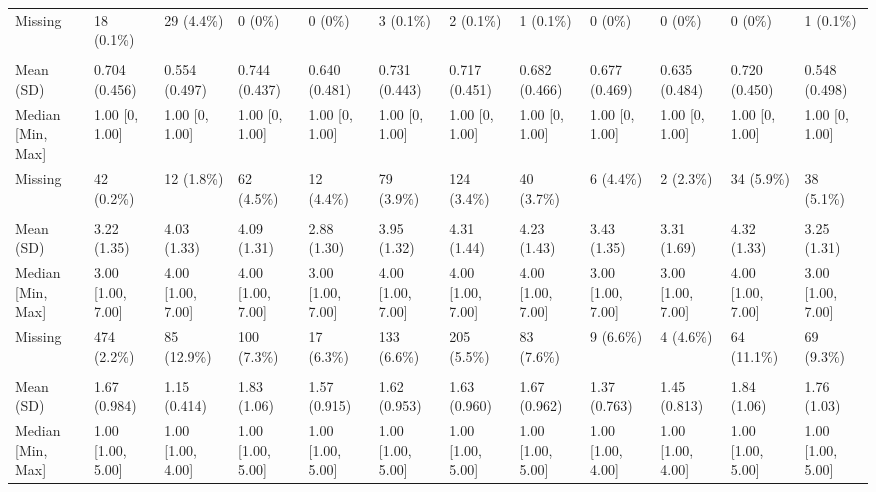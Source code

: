 \documentclass[
  single column]{article}
\begin{document}
\begin{landscape}
\begin{longtable}[t]{llllllllllll}
\hspace{1em}Missing & 18 (0.1\%) & 29 (4.4\%) & 0 (0\%) & 0 (0\%) & 3 (0.1\%) & 2 (0.1\%) & 1 (0.1\%) & 0 (0\%) & 0 (0\%) & 0 (0\%) & 1 (0.1\%)\\
\addlinespace[0.3em]
\multicolumn{12}{l}{\textbf{Partnership Status (Yes/No)}}\\
\hspace{1em}Mean (SD) & 0.704 (0.456) & 0.554 (0.497) & 0.744 (0.437) & 0.640 (0.481) & 0.731 (0.443) & 0.717 (0.451) & 0.682 (0.466) & 0.677 (0.469) & 0.635 (0.484) & 0.720 (0.450) & 0.548 (0.498)\\
\hspace{1em}Median [Min, Max] & 1.00 [0, 1.00] & 1.00 [0, 1.00] & 1.00 [0, 1.00] & 1.00 [0, 1.00] & 1.00 [0, 1.00] & 1.00 [0, 1.00] & 1.00 [0, 1.00] & 1.00 [0, 1.00] & 1.00 [0, 1.00] & 1.00 [0, 1.00] & 1.00 [0, 1.00]\\
\hspace{1em}Missing & 42 (0.2\%) & 12 (1.8\%) & 62 (4.5\%) & 12 (4.4\%) & 79 (3.9\%) & 124 (3.4\%) & 40 (3.7\%) & 6 (4.4\%) & 2 (2.3\%) & 34 (5.9\%) & 38 (5.1\%)\\
\addlinespace[0.3em]
\multicolumn{12}{l}{\textbf{Political Conservatism Level}}\\
\hspace{1em}Mean (SD) & 3.22 (1.35) & 4.03 (1.33) & 4.09 (1.31) & 2.88 (1.30) & 3.95 (1.32) & 4.31 (1.44) & 4.23 (1.43) & 3.43 (1.35) & 3.31 (1.69) & 4.32 (1.33) & 3.25 (1.31)\\
\hspace{1em}Median [Min, Max] & 3.00 [1.00, 7.00] & 4.00 [1.00, 7.00] & 4.00 [1.00, 7.00] & 3.00 [1.00, 7.00] & 4.00 [1.00, 7.00] & 4.00 [1.00, 7.00] & 4.00 [1.00, 7.00] & 3.00 [1.00, 7.00] & 3.00 [1.00, 7.00] & 4.00 [1.00, 7.00] & 3.00 [1.00, 7.00]\\
\hspace{1em}Missing & 474 (2.2\%) & 85 (12.9\%) & 100 (7.3\%) & 17 (6.3\%) & 133 (6.6\%) & 205 (5.5\%) & 83 (7.6\%) & 9 (6.6\%) & 4 (4.6\%) & 64 (11.1\%) & 69 (9.3\%)\\
\addlinespace[0.3em]
\multicolumn{12}{l}{\textbf{Rurality Classification (GCH 2018 Level)}}\\
\hspace{1em}Mean (SD) & 1.67 (0.984) & 1.15 (0.414) & 1.83 (1.06) & 1.57 (0.915) & 1.62 (0.953) & 1.63 (0.960) & 1.67 (0.962) & 1.37 (0.763) & 1.45 (0.813) & 1.84 (1.06) & 1.76 (1.03)\\
\hspace{1em}Median [Min, Max] & 1.00 [1.00, 5.00] & 1.00 [1.00, 4.00] & 1.00 [1.00, 5.00] & 1.00 [1.00, 5.00] & 1.00 [1.00, 5.00] & 1.00 [1.00, 5.00] & 1.00 [1.00, 5.00] & 1.00 [1.00, 4.00] & 1.00 [1.00, 4.00] & 1.00 [1.00, 5.00] & 1.00 [1.00, 5.00]\\

\end{longtable}
\end{landscape}
\end{document}
